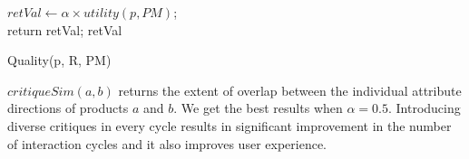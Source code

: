 \begin{algorithm}[ht]
  \DontPrintSemicolon

  $retVal \gets \alpha \times utility(p, PM)$; \\
   {return retVal;}
  \Return retVal
  \caption{Quality(p, R, PM)}
  \label{algo:quality}
\end{algorithm}

$critiqueSim(a, b)$ returns the extent of overlap between the individual attribute directions of products $a$ and $b$.
We get the best results when $\alpha = 0.5$.
Introducing diverse critiques in every cycle results in significant improvement in the number of interaction cycles and it also improves user experience.




